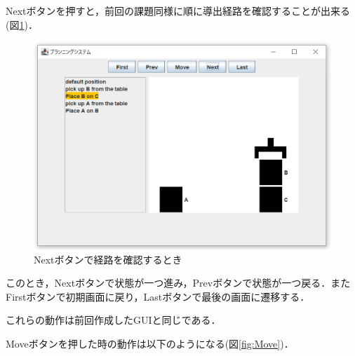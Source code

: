 \documentclass[12pt]{jarticle}
\begin{document}
\clearpage

Nextボタンを押すと，前回の課題同様に順に導出経路を確認することが出来る(図\ref{fig:Normal})．\\

\begin{figure}[htbp]
  \begin{center}
    \includegraphics[scale=0.8]{images/Normal.PNG}
    \caption{Nextボタンで経路を確認するとき}
    \label{fig:Normal}
  \end{center}
\end{figure}
このとき，Nextボタンで状態が一つ進み，Prevボタンで状態が一つ戻る．またFirstボタンで初期画面に戻り，Lastボタンで最後の画面に遷移する．\par
これらの動作は前回作成したGUIと同じである．\\

\clearpage

Moveボタンを押した時の動作は以下のようになる(図\ref{fig:Move})．\\
\end{document}
